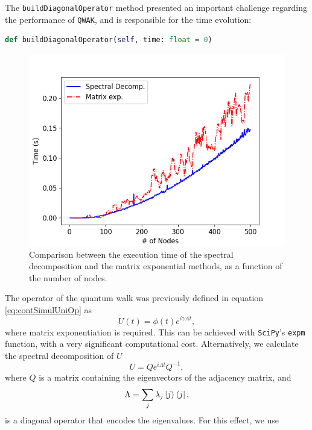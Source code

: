 \documentclass[main.tex]{subfiles}
\begin{document}
The \texttt{buildDiagonalOperator} method presented an important challenge
regarding the performance of \texttt{QWAK}, and is responsible for the time
evolution: 
\begin{lstlisting}[style=commands,mathescape,language=Python]
    def buildDiagonalOperator(self, time: float = 0)
\end{lstlisting}
\begin{figure}[!h]
	\centering
	\includegraphics[scale=0.50]{img/QWAK/expmVsDiag.png}
	\caption{Comparison between the execution time of the spectral decomposition and the matrix exponential methods, as a function of the number of nodes.} 
	\label{fig:expmVsDiag}
\end{figure}
The operator of the quantum walk was previously defined in equation
\eqref{eq:contSimulUniOp} as 
\begin{equation} 
    U(t) = \phi(t) e^{i\gamma A t},
\end{equation} where matrix exponentiation is required. This can be achieved
with \texttt{SciPy}'s \texttt{expm} function, with a very significant
computational cost. Alternatively, we calculate the spectral decomposition of
$U$
\begin{equation}
    U = Q e^{i\Lambda t} Q^{-1} ,
\end{equation}
where $Q$ is a matrix containing the eigenvectors of the adjacency matrix, and 
\begin{equation}
    \Lambda = \sum_{j} \lambda_j \ket{j}\bra{j},
\end{equation}
is a diagonal operator that encodes the eigenvalues. For this effect, we use
\end{document}
